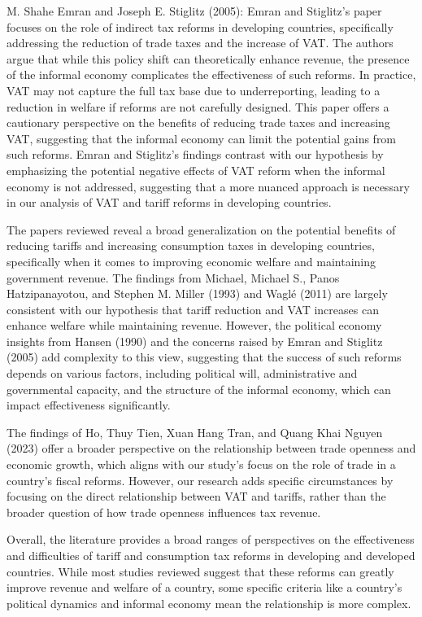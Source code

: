 \documentclass[12pt]{article}
\begin{document}
M. Shahe Emran and Joseph E. Stiglitz (2005):
Emran and Stiglitz’s paper focuses on the role of indirect tax reforms in developing countries, specifically addressing the reduction of trade taxes and the increase of VAT. The authors argue that while this policy shift can theoretically enhance revenue, the presence of the informal economy complicates the effectiveness of such reforms. In practice, VAT may not capture the full tax base due to underreporting, leading to a reduction in welfare if reforms are not carefully designed. This paper offers a cautionary perspective on the benefits of reducing trade taxes and increasing VAT, suggesting that the informal economy can limit the potential gains from such reforms. Emran and Stiglitz's findings contrast with our hypothesis by emphasizing the potential negative effects of VAT reform when the informal economy is not addressed, suggesting that a more nuanced approach is necessary in our analysis of VAT and tariff reforms in developing countries.

The papers reviewed reveal a broad generalization on the potential benefits of reducing tariffs and increasing consumption taxes in developing countries, specifically when it comes to improving economic welfare and maintaining government revenue. The findings from Michael, Michael S., Panos Hatzipanayotou, and Stephen M. Miller (1993) and Waglé (2011) are largely consistent with our hypothesis that tariff reduction and VAT increases can enhance welfare while maintaining revenue. However, the political economy insights from Hansen (1990) and the concerns raised by Emran and Stiglitz (2005) add complexity to this view, suggesting that the success of such reforms depends on various factors, including political will, administrative and governmental capacity, and the structure of the informal economy, which can impact effectiveness significantly.

The findings of Ho, Thuy Tien, Xuan Hang Tran, and Quang Khai Nguyen (2023) offer a broader perspective on the relationship between trade openness and economic growth, which aligns with our study's focus on the role of trade in a country's fiscal reforms. However, our research adds specific circumstances by focusing on the direct relationship between VAT and tariffs, rather than the broader question of how trade openness influences tax revenue.

Overall, the literature provides a broad ranges of perspectives on the effectiveness and difficulties of tariff and consumption tax reforms in developing and developed countries. While most studies reviewed suggest that these reforms can greatly improve revenue and welfare of a country, some specific criteria like a country's political dynamics and informal economy mean the relationship is more complex. 
\end{document}
